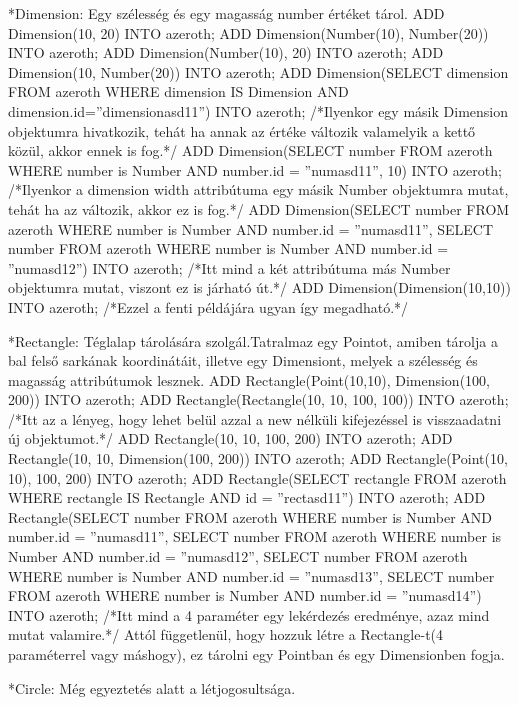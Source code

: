 *Dimension: Egy szélesség és egy magasság number értéket tárol.
ADD Dimension(10, 20) INTO azeroth;
ADD Dimension(Number(10), Number(20)) INTO azeroth;
ADD Dimension(Number(10), 20) INTO azeroth;
ADD Dimension(10, Number(20)) INTO azeroth;
ADD Dimension(SELECT dimension FROM azeroth WHERE dimension IS Dimension AND dimension.id=”dimensionasd11”) INTO azeroth; /*Ilyenkor egy másik Dimension objektumra hivatkozik, tehát ha annak az értéke változik valamelyik a kettő közül, akkor ennek is fog.*/
ADD Dimension(SELECT number FROM azeroth WHERE number is Number AND number.id = ”numasd11”, 10) INTO azeroth; /*Ilyenkor a dimension width attribútuma egy másik Number objektumra mutat, tehát ha az változik, akkor ez is fog.*/
ADD Dimension(SELECT number FROM azeroth WHERE number is Number AND number.id = ”numasd11”, SELECT number FROM azeroth WHERE number is Number AND number.id = ”numasd12”) INTO azeroth;  /*Itt mind a két attribútuma más Number objektumra mutat, viszont ez is járható út.*/
ADD Dimension(Dimension(10,10)) INTO azeroth; /*Ezzel a fenti példájára ugyan így megadható.*/


*Rectangle: Téglalap tárolására szolgál.Tatralmaz egy Pointot, amiben tárolja a bal felső sarkának koordinátáit, illetve egy Dimensiont, melyek a szélesség és magasság attribútumok lesznek.
ADD Rectangle(Point(10,10), Dimension(100, 200)) INTO azeroth;
ADD Rectangle(Rectangle(10, 10, 100, 100)) INTO azeroth; /*Itt az a lényeg, hogy lehet belül azzal a new nélküli kifejezéssel is visszaadatni új objektumot.*/
ADD Rectangle(10, 10, 100, 200) INTO azeroth;
ADD Rectangle(10, 10, Dimension(100, 200)) INTO azeroth;
ADD Rectangle(Point(10, 10), 100, 200) INTO azeroth;
ADD Rectangle(SELECT rectangle FROM azeroth WHERE rectangle IS Rectangle AND id = ”rectasd11”) INTO azeroth;
ADD Rectangle(SELECT number FROM azeroth WHERE number is Number AND number.id = ”numasd11”, SELECT number FROM azeroth WHERE number is Number AND number.id = ”numasd12”, SELECT number FROM azeroth WHERE number is Number AND number.id = ”numasd13”, SELECT number FROM azeroth WHERE number is Number AND number.id = ”numasd14”) INTO azeroth;  /*Itt mind a 4 paraméter egy lekérdezés eredménye, azaz mind mutat valamire.*/
Attól függetlenül, hogy hozzuk létre a Rectangle-t(4 paraméterrel vagy máshogy),  ez tárolni egy Pointban és egy Dimensionben fogja.

*Circle: Még egyeztetés alatt a létjogosultsága.


